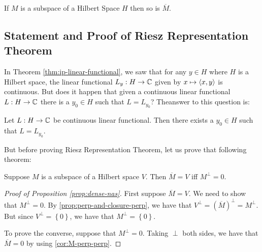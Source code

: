 \begin{exercise}
    If $M$ is a subspace of a Hilbert Space $H$ then so is $\overline M$.
\end{exercise}
\subsection{Statement and Proof of Riesz Representation Theorem}
In Theorem \ref{thm:ip-linear-functional}, we saw that for any $y \in H$ where $H$ is a Hilbert space, the linear functional $L_{y} : H \to \mathbb C$ given by $x \mapsto \left\langle x,y \right\rangle$ is continuous. But does it happen that given a continuous linear functional $L : H \to \mathbb C$ there is a $y_{0} \in H$ such that $L = L_{y_{0}}$? Theanswer to this question is:

\begin{theorem}
    Let $L : H \to \mathbb C$ be continuous linear functional. Then there exists a $y_{0} \in H$ such that $L=L_{y_{0}}$.
    \label{thm:riesz-rep-thm-for-hilbert}
\end{theorem}

But before proving Riesz Representation Theorem, let us prove that following theorem:

\begin{proposition}
    Suppose $M$ is a subspace of a Hilbert space $V$. Then $\overline M = V$ iff $M^{\perp} = 0$.
    \label{prop:dense-nas}
\end{proposition}
\begin{proof}[Proof of Proposition \ref{prop:dense-nas}]
    First suppose $\overline M = V$. We need to show that $M^{\perp} = 0$. By \ref{prop:perp-and-closure-perp}, we have that $V^{\perp} = \left( \overline M \right)^{\perp} = M^{\perp}$. But since $V^{\perp} = \left\{ 0 \right\}$, we have that $M^{\perp} = \left\{ 0 \right\}$.

    To prove the converse, suppose that $M^{\perp} = 0$. Taking $\perp$ both sides, we have that $\overline M = 0$ by using \ref{cor:M-perp-perp}.
\end{proof}



